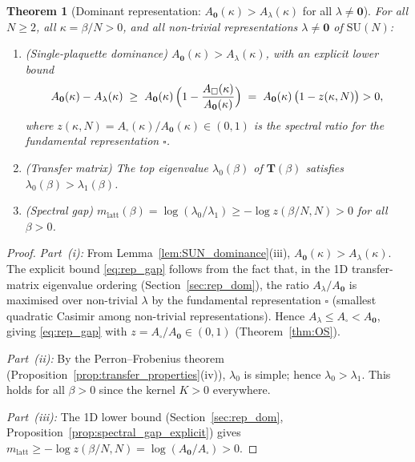 \documentclass[11pt,a4paper]{amsart}
\newtheorem{theorem}{Theorem}[section]
\theoremstyle{definition}
\newcommand{\SU}{\mathrm{SU}}
\begin{document}
\begin{theorem}[Dominant representation: $A_\mathbf{0}(\kappa) > A_\lambda(\kappa)$ for all $\lambda \ne \mathbf{0}$]
\label{thm:dominant_rep}
For all $N \ge 2$, all $\kappa = \beta/N > 0$, and all non-trivial
representations $\lambda \ne \mathbf{0}$ of $\SU(N)$:
\begin{enumerate}[label=(\roman*)]
\item \emph{(Single-plaquette dominance)}
      $A_\mathbf{0}(\kappa) > A_\lambda(\kappa)$,
      with an explicit lower bound
      \begin{equation}
      \label{eq:rep_gap}
        A_\mathbf{0}(\kappa) - A_\lambda(\kappa)
        \;\ge\; A_\mathbf{0}(\kappa)\,
        \Bigl(1 - \frac{A_\square(\kappa)}{A_\mathbf{0}(\kappa)}\Bigr)
        \;=\; A_\mathbf{0}(\kappa)\,\bigl(1-z(\kappa,N)\bigr) > 0,
      \end{equation}
      where $z(\kappa,N) = A_\square(\kappa)/A_\mathbf{0}(\kappa) \in (0,1)$
      is the spectral ratio for the fundamental representation $\square$.
\item \emph{(Transfer matrix)} The top eigenvalue $\lambda_0(\beta)$ of
      $\mathbf{T}(\beta)$ satisfies $\lambda_0(\beta) > \lambda_1(\beta)$.
\item \emph{(Spectral gap)}
      $m_{\mathrm{latt}}(\beta) = \log(\lambda_0/\lambda_1) \ge -\log z(\beta/N,N) > 0$
      for all $\beta > 0$.
\end{enumerate}
\end{theorem}

\begin{proof}
\emph{Part~(i):}
From Lemma~\ref{lem:SUN_dominance}(iii), $A_\mathbf{0}(\kappa) > A_\lambda(\kappa)$.
The explicit bound \eqref{eq:rep_gap} follows from the fact that, in the
1D transfer-matrix eigenvalue ordering
(Section~\ref{sec:rep_dom}), the ratio $A_\lambda/A_\mathbf{0}$ is maximised
over non-trivial $\lambda$ by the fundamental representation $\square$
(smallest quadratic Casimir among non-trivial representations).
Hence $A_\lambda \le A_\square < A_\mathbf{0}$, giving \eqref{eq:rep_gap}
with $z = A_\square/A_\mathbf{0} \in (0,1)$ (Theorem~\ref{thm:OS}).

\emph{Part~(ii):}
By the Perron--Frobenius theorem
(Proposition~\ref{prop:transfer_properties}(iv)),
$\lambda_0$ is simple; hence $\lambda_0 > \lambda_1$.
This holds for all $\beta > 0$ since the kernel $K > 0$ everywhere.

\emph{Part~(iii):}
The 1D lower bound (Section~\ref{sec:rep_dom}, Proposition~\ref{prop:spectral_gap_explicit})
gives $m_{\mathrm{latt}} \ge -\log z(\beta/N,N) = \log(A_\mathbf{0}/A_\square) > 0$.
\end{proof}
\end{document}
